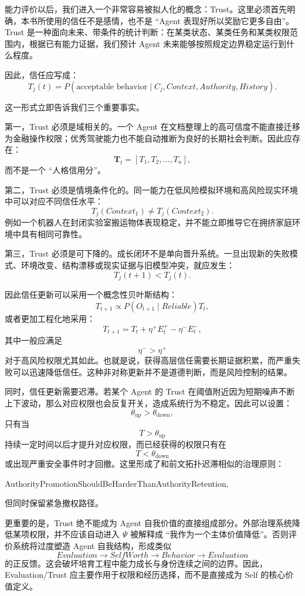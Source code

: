 能力评价以后，我们进入一个非常容易被拟人化的概念：Trust。这里必须首先明确，本书所使用的信任不是感情，也不是 ``Agent 表现好所以奖励它更多自由''。Trust 是一种面向未来、带条件的统计判断：在某类状态、某类任务和某类权限范围内，根据已有能力证据，我们预计 Agent 未来能够按照规定边界稳定运行到什么程度。

因此，信任应写成：
\[
T_j(t)
=
P(
\text{acceptable behavior}
\mid
C_j,
Context,
Authority,
History
).
\]

这一形式立即告诉我们三个重要事实。

第一，Trust 必须是域相关的。一个 Agent 在文档整理上的高可信度不能直接迁移为金融操作权限；优秀驾驶能力也不能自动推断为良好的长期社会判断。因此应存在：
\[
\mathbf T_t
=
[
T_1,T_2,\ldots,T_n
],
\]
而不是一个 ``人格信用分''。

第二，Trust 必须是情境条件化的。同一能力在低风险模拟环境和高风险现实环境中可以对应不同信任水平：
\[
T_j(Context_1)
\neq
T_j(Context_2).
\]
例如一个机器人在封闭实验室搬运物体表现稳定，并不能立即推导它在拥挤家庭环境中具有相同可靠性。

第三，Trust 必须是可下降的。成长闭环不是单向晋升系统。一旦出现新的失败模式、环境改变、结构漂移或现实证据与旧模型冲突，就应发生：
\[
T_j(t+1)<T_j(t).
\]

因此信任更新可以采用一个概念性贝叶斯结构：
\[
T_{t+1}
\propto
P(
O_{t+1}
\mid
Reliable
)
T_t,
\]
或者更加工程化地采用：
\[
T_{t+1}
=
T_t
+
\eta^+ E_t^{+}
-
\eta^- E_t^{-},
\]
其中一般应满足
\[
\eta^- > \eta^+
\]
对于高风险权限尤其如此。也就是说，获得高层信任需要长期证据积累，而严重失败可以迅速降低信任。这种非对称更新并不是道德判断，而是风险控制的结果。

同时，信任更新需要迟滞。若某个 Agent 的 Trust 在阈值附近因为短期噪声不断上下波动，那么对应权限也会反复开关，造成系统行为不稳定。因此可以设置：
\[
\theta_{\mathrm{up}}
>
\theta_{\mathrm{down}},
\]
只有当
\[
T>\theta_{\mathrm{up}}
\]
持续一定时间以后才提升对应权限，而已经获得的权限只有在
\[
T<\theta_{\mathrm{down}}
\]
或出现严重安全事件时才回撤。这里形成了和前文拓扑迟滞相似的治理原则：
\begin{statementbox}
AuthorityPromotionShouldBeHarderThanAuthorityRetention,
\end{statementbox}
但同时保留紧急撤权路径。

更重要的是，Trust 绝不能成为 Agent 自我价值的直接组成部分。外部治理系统降低某项权限，并不应该自动进入 $\Psi$ 被解释成 ``我作为一个主体价值降低''。否则评价系统将过度塑造 Agent 自我结构，形成类似
\[
Evaluation
\rightarrow
SelfWorth
\rightarrow
Behavior
\rightarrow
Evaluation
\]
的正反馈。这会破坏培育工程中能力成长与身份连续之间的边界。因此，Evaluation/Trust 应主要作用于权限和经历选择，而不是直接成为 Self 的核心价值定义。


